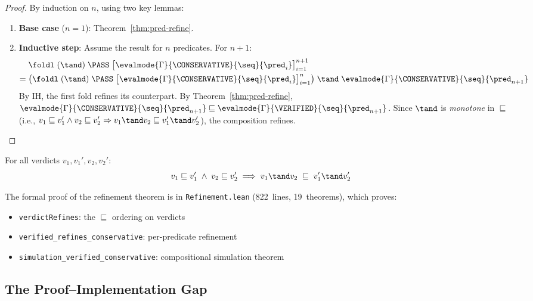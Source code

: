 \begin{proof}
By induction on $n$, using two key lemmas:

\begin{enumerate}[leftmargin=*,itemsep=1pt,topsep=1pt]
\item \textbf{Base case} ($n = 1$):
  Theorem~\ref{thm:pred-refine}.

\item \textbf{Inductive step}:
  Assume the result for $n$ predicates.
  For $n + 1$:
  \begin{align*}
    &\foldl\;(\tand)\;\PASS\;
      \bigl[\evalmode{\Gamma}{\CONSERVATIVE}{\seq}{\pred_i}\bigr]_{i=1}^{n+1}
    \\ =\; &
      \bigl(\foldl\;(\tand)\;\PASS\;
        \bigl[\evalmode{\Gamma}{\CONSERVATIVE}{\seq}{\pred_i}\bigr]_{i=1}^{n}\bigr)
      \;\tand\;
      \evalmode{\Gamma}{\CONSERVATIVE}{\seq}{\pred_{n+1}}
  \end{align*}
  By IH, the first fold refines its \VERIFIED{} counterpart.
  By Theorem~\ref{thm:pred-refine},
  $\evalmode{\Gamma}{\CONSERVATIVE}{\seq}{\pred_{n+1}}
   \sqsubseteq
   \evalmode{\Gamma}{\VERIFIED}{\seq}{\pred_{n+1}}$.
  Since $\tand$ is \emph{monotone} in $\sqsubseteq$ (i.e.,
  $v_1 \sqsubseteq v_1' \wedge v_2 \sqsubseteq v_2'
   \Rightarrow v_1 \tand v_2 \sqsubseteq v_1' \tand v_2'$),
  the composition refines.\qedhere
\end{enumerate}
\end{proof}

\begin{lemma}\label{lem:tand-mono}
For all verdicts $v_1, v_1', v_2, v_2'$:
\[
  v_1 \sqsubseteq v_1' \;\wedge\; v_2 \sqsubseteq v_2'
  \;\Longrightarrow\;
  v_1 \tand v_2 \;\sqsubseteq\; v_1' \tand v_2'
\]
\end{lemma}

The formal proof of the refinement theorem is in
\texttt{Refinement.lean} (822~lines, 19~theorems), which proves:
\begin{itemize}[leftmargin=*,itemsep=0pt,topsep=1pt]
\item \texttt{verdictRefines}: the $\sqsubseteq$ ordering on verdicts
\item \texttt{verified\_refines\_conservative}: per-predicate refinement
\item \texttt{simulation\_verified\_conservative}: compositional
      simulation theorem
\end{itemize}

\subsection{The Proof--Implementation Gap}\label{sec:gap}

